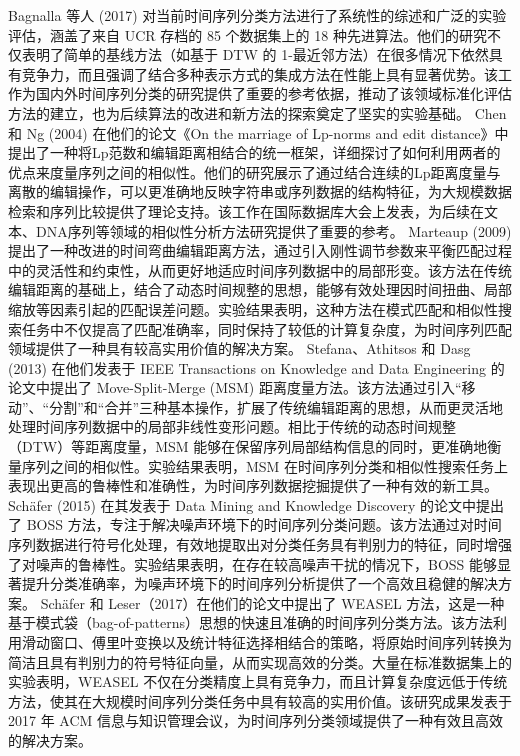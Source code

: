 Bagnalla 等人 (2017) 对当前时间序列分类方法进行了系统性的综述和广泛的实验评估，涵盖了来自 UCR 存档的 85 个数据集上的 18 种先进算法。他们的研究不仅表明了简单的基线方法（如基于 DTW 的 1-最近邻方法）在很多情况下依然具有竞争力，而且强调了结合多种表示方式的集成方法在性能上具有显著优势。该工作为国内外时间序列分类的研究提供了重要的参考依据，推动了该领域标准化评估方法的建立，也为后续算法的改进和新方法的探索奠定了坚实的实验基础。
Chen 和 Ng (2004) 在他们的论文《On the marriage of Lp-norms and edit distance》中提出了一种将Lp范数和编辑距离相结合的统一框架，详细探讨了如何利用两者的优点来度量序列之间的相似性。他们的研究展示了通过结合连续的Lp距离度量与离散的编辑操作，可以更准确地反映字符串或序列数据的结构特征，为大规模数据检索和序列比较提供了理论支持。该工作在国际数据库大会上发表，为后续在文本、DNA序列等领域的相似性分析方法研究提供了重要的参考。
Marteaup (2009) 提出了一种改进的时间弯曲编辑距离方法，通过引入刚性调节参数来平衡匹配过程中的灵活性和约束性，从而更好地适应时间序列数据中的局部形变。该方法在传统编辑距离的基础上，结合了动态时间规整的思想，能够有效处理因时间扭曲、局部缩放等因素引起的匹配误差问题。实验结果表明，这种方法在模式匹配和相似性搜索任务中不仅提高了匹配准确率，同时保持了较低的计算复杂度，为时间序列匹配领域提供了一种具有较高实用价值的解决方案。
Stefana、Athitsos 和 Dasg (2013) 在他们发表于 IEEE Transactions on Knowledge and Data Engineering 的论文中提出了 Move-Split-Merge (MSM) 距离度量方法。该方法通过引入“移动”、“分割”和“合并”三种基本操作，扩展了传统编辑距离的思想，从而更灵活地处理时间序列数据中的局部非线性变形问题。相比于传统的动态时间规整（DTW）等距离度量，MSM 能够在保留序列局部结构信息的同时，更准确地衡量序列之间的相似性。实验结果表明，MSM 在时间序列分类和相似性搜索任务上表现出更高的鲁棒性和准确性，为时间序列数据挖掘提供了一种有效的新工具。
Schäfer (2015) 在其发表于 Data Mining and Knowledge Discovery 的论文中提出了 BOSS 方法，专注于解决噪声环境下的时间序列分类问题。该方法通过对时间序列数据进行符号化处理，有效地提取出对分类任务具有判别力的特征，同时增强了对噪声的鲁棒性。实验结果表明，在存在较高噪声干扰的情况下，BOSS 能够显著提升分类准确率，为噪声环境下的时间序列分析提供了一个高效且稳健的解决方案。
Schäfer 和 Leser（2017）在他们的论文中提出了 WEASEL 方法，这是一种基于模式袋（bag-of-patterns）思想的快速且准确的时间序列分类方法。该方法利用滑动窗口、傅里叶变换以及统计特征选择相结合的策略，将原始时间序列转换为简洁且具有判别力的符号特征向量，从而实现高效的分类。大量在标准数据集上的实验表明，WEASEL 不仅在分类精度上具有竞争力，而且计算复杂度远低于传统方法，使其在大规模时间序列分类任务中具有较高的实用价值。该研究成果发表于 2017 年 ACM 信息与知识管理会议，为时间序列分类领域提供了一种有效且高效的解决方案。
